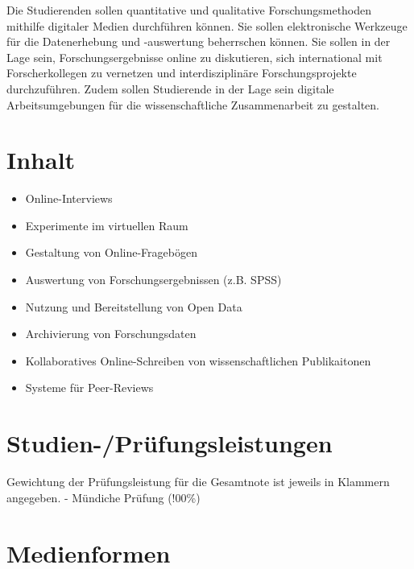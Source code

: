 Die Studierenden sollen quantitative und qualitative Forschungsmethoden
mithilfe digitaler Medien durchführen können. Sie sollen elektronische
Werkzeuge für die Datenerhebung und -auswertung beherrschen können. Sie
sollen in der Lage sein, Forschungsergebnisse online zu diskutieren,
sich international mit Forscherkollegen zu vernetzen und
interdisziplinäre Forschungsprojekte durchzuführen. Zudem sollen
Studierende in der Lage sein digitale Arbeitsumgebungen für die
wissenschaftliche Zusammenarbeit zu gestalten.

\section*{Inhalt\label{/mi-2017/modulbeschreibungen-master/MA_SC_WPF_eScience}}\label{inhaltpathlabelmi-2017modulbeschreibungen-mastermaux5fscux5fwpfux5fescience}

\begin{itemize}
\tightlist
\item
  Online-Interviews
\item
  Experimente im virtuellen Raum
\item
  Gestaltung von Online-Fragebögen
\item
  Auswertung von Forschungsergebnissen (z.B. SPSS)
\item
  Nutzung und Bereitstellung von Open Data
\item
  Archivierung von Forschungsdaten
\item
  Kollaboratives Online-Schreiben von wissenschaftlichen Publikaitonen
\item
  Systeme für Peer-Reviews
\end{itemize}

\section*{Studien-/Prüfungsleistungen\label{/mi-2017/modulbeschreibungen-master/MA_SC_WPF_eScience}}\label{studien-pruxfcfungsleistungenpathlabelmi-2017modulbeschreibungen-mastermaux5fscux5fwpfux5fescience}

Gewichtung der Prüfungsleistung für die Gesamtnote ist jeweils in
Klammern angegeben. - Mündiche Prüfung (!00\%)

\section*{Medienformen\label{/mi-2017/modulbeschreibungen-master/MA_SC_WPF_eScience}}\label{medienformenpathlabelmi-2017modulbeschreibungen-mastermaux5fscux5fwpfux5fescience}

